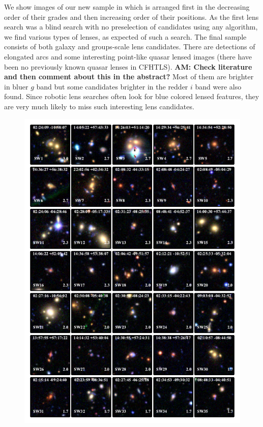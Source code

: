 \documentclass[useAMS,usenatbib,a4paper]{mn2e}
\begin{document}
We show images of our new sample in  which is arranged first in the
decreasing order of their grades and then increasing order of their positions.
As the first lens search was a blind search with no preselection of candidates
using any algorithm, we find various types of lenses, as expected of such a
search. The final sample consists of both galaxy and groups-scale lens
candidates. There are detections of elongated arcs and some interesting
point-like quasar lensed images (there have been no previously known quasar
lenses in CFHTLS). {\bf AM: Check literature and then comment about this in the
abstract?} Most of them are brighter in bluer $g$ band but some candidates
brighter in the redder $i$ band were also found. Since robotic lens searches
often look for blue colored lensed features, they are very much likely to miss
such interesting lens candidates.



\begin{figure}
\begin{center}
\includegraphics[scale=1.9]{sw-cfhtls-figs/lenscandfin.pdf}
\end{center}
\end{figure}
\end{document}
